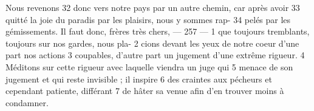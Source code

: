 Nous revenons	 
32	 	donc vers notre pays par un autre chemin, car après avoir	 
33	 	quitté la joie du paradis par les plaisirs, nous y sommes rap-	 
34	 	pelés par les gémissements. Il faut donc, frères très chers,	 
 	--- 257 ---	 
1	 	que toujours tremblants, toujours sur nos gardes, nous pla-	 
2	 	cions devant les yeux de notre coeur d'une part nos actions	 
3	 	coupables, d'autre part un jugement d'une extrême rigueur.	 
4	 	Méditons sur cette rigueur avec laquelle viendra un juge qui	 
5	 	menace de son jugement et qui reste invisible ; il inspire	 
6	 	des craintes aux pécheurs et cependant patiente, différant	 
7	 	de hâter sa venue afin d'en trouver moins à condamner.